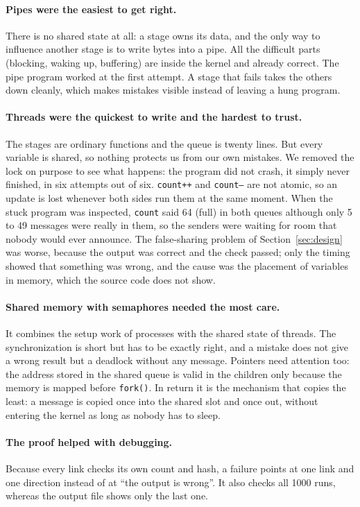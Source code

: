 \documentclass[11pt,a4paper]{article}
\begin{document}
\paragraph{Pipes were the easiest to get right.} There is no shared state at all: a stage owns its
data, and the only way to influence another stage is to write bytes into a pipe. All the difficult
parts (blocking, waking up, buffering) are inside the kernel and already correct. The pipe program
worked at the first attempt. A stage that fails takes
the others down cleanly, which makes mistakes visible instead of leaving a hung program.

\paragraph{Threads were the quickest to write and the hardest to trust.} The stages are ordinary
functions and the queue is twenty lines. But every variable is shared, so nothing protects us from
our own mistakes. We removed the lock on purpose to see what happens: the program did not crash,
it simply never finished, in six attempts out of six. \texttt{count++} and \texttt{count--} are not
atomic, so an update is lost whenever both sides run them at the same moment. When the stuck program
was inspected, \texttt{count} said 64 (full) in both queues although only 5 to 49 messages were
really in them, so the senders were waiting for room that nobody would ever announce. The
false-sharing problem of Section~\ref{sec:design} was worse, because the
output was correct and the check passed; only the timing showed that something was wrong, and the
cause was the placement of variables in memory, which the source code does not show.

\paragraph{Shared memory with semaphores needed the most care.} It combines the setup work of
processes with the shared state of threads. The synchronization is short but has to be exactly
right, and a mistake does not give a wrong result but a deadlock without any message. Pointers need
attention too: the address stored in the shared queue is valid in the children only because the
memory is mapped before \texttt{fork()}. In return it is the mechanism that copies the least: a
message is copied once into the shared slot and once out, without entering the kernel as long as
nobody has to sleep.

\paragraph{The proof helped with debugging.} Because every link checks its own count and hash, a
failure points at one link and one direction instead of at ``the output is wrong''. It also checks
all 1000 runs, whereas the output file shows only the last one.
\end{document}
